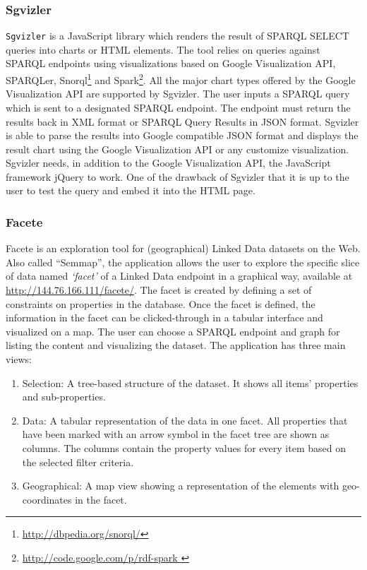 \subsubsection{Sgvizler}
\texttt{Sgvizler} \cite{Martin2012} is a JavaScript library which renders the result of SPARQL SELECT queries into charts or HTML elements. The tool relies on queries against SPARQL endpoints using visualizations based on Google Visualization API, SPARQLer, Snorql\footnote{\url{http://dbpedia.org/snorql/}} and Spark\footnote{\url{http://code.google.com/p/rdf-spark }}. All the major chart types offered by the Google Visualization API are supported by Sgvizler. The user inputs a SPARQL query which is sent to a designated SPARQL endpoint. The endpoint must return the results back in XML format or SPARQL Query Results in JSON format. Sgvizler is able to parse the results into Google compatible JSON format  and displays the result chart using the Google Visualization API or any customize visualization. Sgvizler needs, in addition to the Google Visualization API, the JavaScript framework jQuery  to work. One of the drawback of Sgvizler that it is up to the user to test the query and embed it into the HTML page.

\subsubsection{Facete}
Facete \cite{facete:2014} is an exploration tool for (geographical) Linked Data datasets on the Web. Also called ``Semmap'', the application allows the user to explore the specific slice of data named \textit{`facet'}  of a Linked Data endpoint in a graphical way, available at \url{http://144.76.166.111/facete/}. The facet is created by defining a set of constraints on properties in the database. Once the facet is defined, the information in the facet can be clicked-through in a tabular interface and visualized on a map. The user can choose a SPARQL endpoint and graph for listing the content and visualizing the dataset. The application has three main views:
\begin{enumerate}
\item Selection: A tree-based structure of the dataset. It shows all items' properties and sub-properties.
\item  Data: A tabular representation of the data in one facet. All properties that have been marked with an arrow symbol in the facet tree are shown as columns. The columns contain the property values for every item based on the selected filter criteria.
\item Geographical: A map view showing a representation of the elements with geo-coordinates in the facet.
\end{enumerate}


